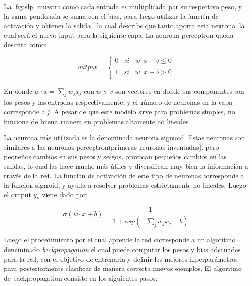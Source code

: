La \autoref{fig:slp} muestra como cada entrada es multiplicada por su respectivo peso, y la suma ponderada se suma con el bias, para luego utilizar la función de activación y obtener la salida , la cual describe que tanto aporta esta neurona, la cual será el nuevo input para la siguiente capa. La neurona perceptron queda descrita como:

\begin{equation}
output = \left\{ \begin{array}{lcc}
             0 &   si  & w \cdot x + b \leq 0 \\
             \\ 1 &  si & w \cdot x + b > 0 \\
             \end{array} \right.
\end{equation}

En donde $ w\cdot x = \sum_{j} w_{j} x_{j} $ con $w$ y $x$ son vectores en donde sus componentes son los pesos y las entradas respectivamente, y el número de neuronas en la capa corresponde a $j$. A pesar de que este modelo sirve para problemas simples, no funciona de buena manera en problemas altamente no lineales. 

La neurona más utilizada es la denominada neurona sigmoid. Estas neuronas son similares a las neuronas perceptron(primeras neuronas inventadas), pero pequeños cambios en sus pesos y sesgos, provocan pequeños cambios en las salidas, lo cual las hace mucho más útiles y diversifican muy bien la información a través de la red. La función de activación de este tipo de neuronas corresponde a la función sigmoid, y ayuda a resolver problemas estrictamente no lineales. Luego el output $y_{k}$ viene dado por:


\begin{equation} \sigma( w \cdot x + b) = \frac{1}{1 + exp(- \sum_{j} w_{j}x_{j} - b)} \end{equation}

Luego el procedimiento por el cual aprende la red corresponde a un algoritmo denominado \textit{backpropagation} el cual puede computar los pesos y bias adecuados para la red, con el objetivo de entrenarla y definir los mejores hiperparámetros para posteriormente clasificar de manera correcta nuevos ejemplos. El algoritmo de backpropagation consiste en los siguientes pasos:

